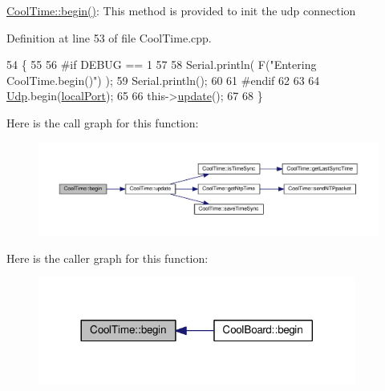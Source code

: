 \hyperlink{class_cool_time_ab1976cf718b950bc31e003c3323b8adb}{Cool\+Time\+::begin()}\+: This method is provided to init the udp connection 

Definition at line 53 of file Cool\+Time.\+cpp.


\begin{DoxyCode}
54 \{
55 
56 \textcolor{preprocessor}{#if DEBUG == 1 }
57 
58     Serial.println( F(\textcolor{stringliteral}{"Entering CoolTime.begin()"}) );
59     Serial.println();
60 
61 \textcolor{preprocessor}{#endif }
62 
63 
64     \hyperlink{class_cool_time_a4e23216a8121ca79d0fb019f30884b92}{Udp}.begin(\hyperlink{class_cool_time_a2f777da44d7ba678be8185299e9b49d1}{localPort});
65     
66     this->\hyperlink{class_cool_time_aae601f795452cfa48d9fb337aed483a8}{update}();
67     
68 \}
\end{DoxyCode}
Here is the call graph for this function\+:\nopagebreak
\begin{figure}[H]
\begin{center}
\leavevmode
\includegraphics[width=350pt]{d6/d49/class_cool_time_ab1976cf718b950bc31e003c3323b8adb_cgraph}
\end{center}
\end{figure}
Here is the caller graph for this function\+:\nopagebreak
\begin{figure}[H]
\begin{center}
\leavevmode
\includegraphics[width=296pt]{d6/d49/class_cool_time_ab1976cf718b950bc31e003c3323b8adb_icgraph}
\end{center}
\end{figure}
\mbox{\label{class_cool_time_a87c28260c1bc77091162cbcf1ee2e129}} 
